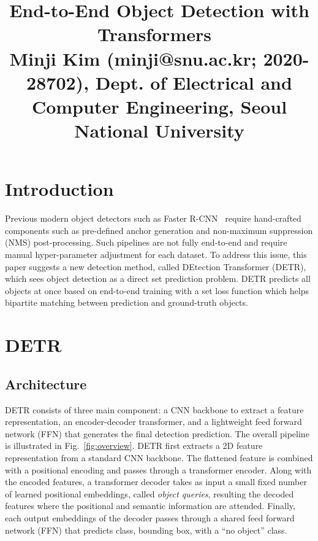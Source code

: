 \documentclass[10pt,twocolumn,letterpaper]{article}
\begin{document}
\title{End-to-End Object Detection with Transformers~\cite{detr} \\ {\rm {\normalsize Minji Kim (minji@snu.ac.kr; 2020-28702), Dept. of Electrical and Computer Engineering, Seoul National University}}}   %

\maketitle
\thispagestyle{empty}


\section{Introduction}
Previous modern object detectors such as Faster R-CNN~\cite{fasterrcnn} require hand-crafted components such as pre-defined anchor generation and non-maximum suppression (NMS) post-processing.
Such pipelines are not fully end-to-end and require manual hyper-parameter adjustment for each dataset.
To address this issue, this paper suggests a new detection method, called DEtection Transformer (DETR), which sees object detection as a direct set prediction problem.
DETR predicts all objects at once based on end-to-end training with a set loss function which helps bipartite matching between prediction and ground-truth objects.



\section{DETR}

\subsection{Architecture}
DETR consists of three main component: a CNN backbone to extract a feature representation, an encoder-decoder transformer, and a lightweight feed forward network (FFN) that generates the final detection prediction.
The overall pipeline is illustrated in Fig.~\ref{fig:overview}.
DETR first extracts a 2D feature representation from a standard CNN backbone.
The flattened feature is combined with a positional encoding and passes through a transformer encoder.
Along with the encoded features, a transformer decoder takes as input a small fixed number of learned positional embeddings, called \textit{object queries}, resulting the decoded features where the positional and semantic information are attended.
Finally, each output embeddings of the decoder passes through a shared feed forward network (FFN) that predicts class, bounding box, with a ``no object'' class.
\end{document}
